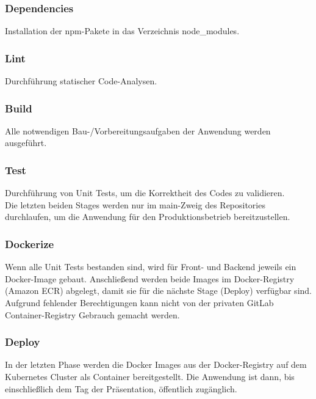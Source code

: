 \documentclass[letterpaper, 10 pt, conference]{ieeeconf}
\begin{document}
\subsubsection{Dependencies}

Installation der npm-Pakete in das Verzeichnis node\_modules.

\subsubsection{Lint}

Durchführung statischer Code-Analysen.

\subsubsection{Build}

Alle notwendigen Bau-/Vorbereitungsaufgaben der Anwendung werden ausgeführt.

\subsubsection{Test}

Durchführung von Unit Tests, um die Korrektheit des Codes zu validieren.  \\

Die letzten beiden Stages werden nur im main-Zweig des Repositories durchlaufen, um die Anwendung für den Produktionsbetrieb bereitzustellen.

\subsubsection{Dockerize}

Wenn alle Unit Tests bestanden sind, wird für Front- und Backend jeweils ein Docker-Image gebaut. Anschließend werden beide Images im Docker-Registry (Amazon ECR) abgelegt, damit sie für die nächste Stage (Deploy) verfügbar sind.  Aufgrund fehlender Berechtigungen kann nicht von der privaten GitLab Container-Registry Gebrauch gemacht werden.

\subsubsection{Deploy}

In der letzten Phase werden die Docker Images aus der Docker-Registry auf dem Kubernetes Cluster als Container bereitgestellt. Die Anwendung ist dann,  bis einschließlich dem Tag der Präsentation, öffentlich zugänglich.
\end{document}
